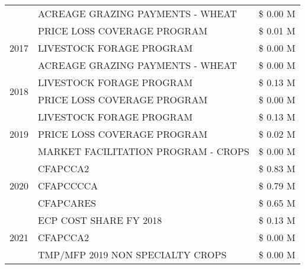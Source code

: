 \begin{tabular}{llr}
 & ACREAGE GRAZING PAYMENTS - WHEAT & \$ 0.00 M \\
\cline{1-3}
\multirow[t]{3}{*}{2017} & PRICE LOSS COVERAGE PROGRAM & \$ 0.01 M \\
 & LIVESTOCK FORAGE PROGRAM & \$ 0.00 M \\
 & ACREAGE GRAZING PAYMENTS - WHEAT & \$ 0.00 M \\
\cline{1-3}
\multirow[t]{2}{*}{2018} & LIVESTOCK FORAGE PROGRAM & \$ 0.13 M \\
 & PRICE LOSS COVERAGE PROGRAM & \$ 0.00 M \\
\cline{1-3}
\multirow[t]{3}{*}{2019} & LIVESTOCK FORAGE PROGRAM & \$ 0.13 M \\
 & PRICE LOSS COVERAGE PROGRAM & \$ 0.02 M \\
 & MARKET FACILITATION PROGRAM - CROPS & \$ 0.00 M \\
\cline{1-3}
\multirow[t]{3}{*}{2020} & CFAPCCA2 & \$ 0.83 M \\
 & CFAPCCCCA & \$ 0.79 M \\
 & CFAPCARES & \$ 0.65 M \\
\cline{1-3}
\multirow[t]{3}{*}{2021} & ECP COST SHARE FY 2018 & \$ 0.13 M \\
 & CFAPCCA2 & \$ 0.00 M \\
 & TMP/MFP 2019 NON SPECIALTY CROPS & \$ 0.00 M \\
\cline{1-3}
\bottomrule
\end{tabular}

